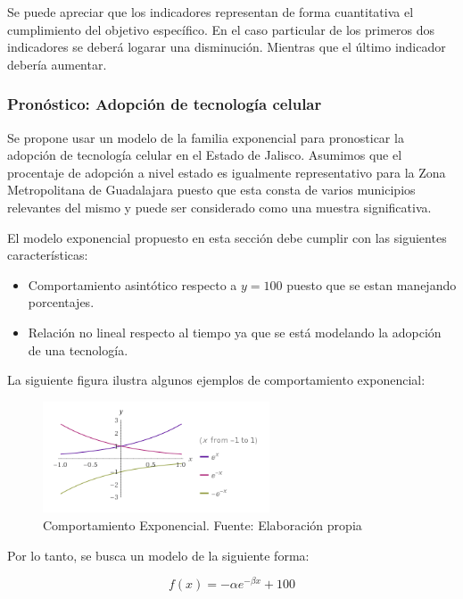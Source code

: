 \documentclass{article}
\begin{document}
Se puede apreciar que los indicadores representan de forma cuantitativa el cumplimiento del objetivo específico.
En el caso particular de los primeros dos indicadores se deberá logarar una disminución. Mientras que el último
indicador debería aumentar.

\subsubsection{Pronóstico: Adopción de tecnología celular}

Se propone usar un modelo de la familia exponencial para pronosticar la adopción de tecnología celular en el Estado
de Jalisco. Asumimos que el procentaje de adopción a nivel estado es igualmente representativo para la Zona
Metropolitana de Guadalajara puesto que esta consta de varios municipios relevantes del mismo y
puede ser considerado como una muestra significativa.

El modelo exponencial propuesto en esta sección debe cumplir con las siguientes características:
\begin{itemize}
	\item Comportamiento asintótico respecto a $y=100$ puesto que se estan manejando porcentajes.
	\item Relación no lineal respecto al tiempo ya que se está modelando la adopción de una tecnología.
\end{itemize}

La siguiente figura ilustra algunos ejemplos de comportamiento exponencial:

	\begin{figure}[H]\centering
	\includegraphics[width=0.6\textwidth]{resources/img/modelo_exp.png}
	\caption{\label{fig:exponential_behaviour} Comportamiento Exponencial. Fuente: Elaboración propia}
    \end{figure}

Por lo tanto, se busca un modelo de la siguiente forma:

\begin{equation}
f(x) = -\alpha e^{-\beta x} + 100
\end{equation}
\end{document}
